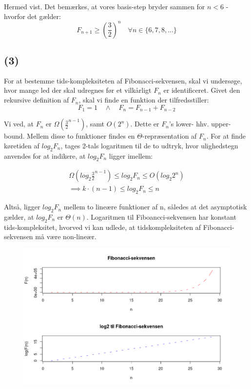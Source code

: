 \documentclass[a4paper,10pt]{article}
\begin{document}
Hermed vist. Det bemærkes, at vores basis-step bryder sammen for $n < 6$ - hvorfor det gælder:
$$
F_{n+1} \geq (\frac{3}{2})^{n} \quad \forall n \in \{6, 7, 8,...\}
$$

\subsection*{(3)}

For at bestemme tids-kompleksiteten af Fibonacci-sekvensen, skal vi undersøge, hvor mange led der skal udregnes før et vilkårligt $F_{n}$ er identificeret. Givet den rekursive definition af $F_{n}$, skal vi finde en funktion der tilfredsstiller:
$$
F_{1} = 1 \quad \wedge \quad
F_{n} = F_{n-1} + F_{n-2}
$$

Vi ved, at $F_{n}$ er $\Omega (\frac{3}{2}^{n-1})$, samt $O (2^{n})$. Dette er $F_{n}$'s lower- hhv. upper-bound. Mellem disse to funktioner findes en $\Theta$-repræsentation af $F_{n}$. For at finde køretiden af $log_{2}F_{n}$, tages 2-tals logaritmen til de to udtryk, hvor ulighedstegn anvendes for at indikere, at $log_{2}F_{n}$ ligger imellem:

\begin{equation}
\begin{aligned}	
\Omega (log_{2}\frac{3}{2}^{n-1}) \leq log_{2}F_{n} \leq  O (log_{2}2^{n}) \\
\implies k \cdot (n-1) \leq log_{2}F_{n} \leq n
\end{aligned}
\end{equation}

Altså, ligger $log_{2}F_{n}$ mellem to lineære funktioner af n, således at det asymptotisk gælder, at $log_{2}F_{n}$ er $\Theta(n)$. Logaritmen til Fiboancci-sekvensen har konstant tids-kompleksitet, hvorved vi kan udlede, at tidskompleksiteten af Fibonacci-sekvensen må være non-lineær.  

\begin{figure}[H]
\centering
\includegraphics[scale = 0.5]{fibSeq.png}
\end{figure}
\end{document}
